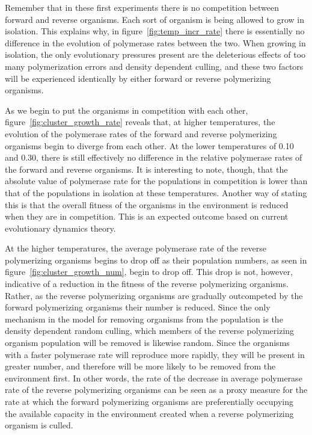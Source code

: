 Remember that in these first experiments there is no competition between forward and reverse organisms. Each sort of organism is being allowed to grow in isolation. This explains why, in figure~\ref{fig:temp_incr_rate} there is essentially no difference in the evolution of polymerase rates between the two. When growing in isolation, the only evolutionary pressures present are the deleterious effects of too many polymerization errors and density dependent culling, and these two factors will be experienced identically by either forward or reverse polymerizing organisms.

As we begin to put the organisms in competition with each other, figure~\ref{fig:cluster_growth_rate} reveals that, at higher temperatures, the evolution of the polymerase rates of the forward and reverse polymerizing organisms begin to diverge from each other. At the lower temperatures of 0.10 and 0.30, there is still effectively no difference in the relative polymerase rates of the forward and reverse organisms. It is interesting to note, though, that the absolute value of polymerase rate for the populations in competition is lower than that of the populations in isolation at these temperatures. Another way of stating this is that the overall fitness of the organisms in the environment is reduced when they are in competition. This is an expected outcome based on current evolutionary dynamics theory.

At the higher temperatures, the average polymerase rate of the reverse polymerizing organisms begins to drop off as their population numbers, as seen in figure~\ref{fig:cluster_growth_num}, begin to drop off. This drop is not, however, indicative of a reduction in the fitness of the reverse polymerizing organisms. Rather, as the reverse polymerizing organisms are gradually outcompeted by the forward polymerizing organisms their number is reduced. Since the only mechanism in the model for removing organisms from the population is the density dependent random culling, which members of the reverse polymerizing organism population will be removed is likewise random. Since the organisms with a faster polymerase rate will reproduce more rapidly, they will be present in greater number, and therefore will be more likely to be removed from the environment first. In other words, the rate of the decrease in average polymerase rate of the reverse polymerizing organisms can be seen as a proxy measure for the rate at which the forward polymerizing organisms are preferentially occupying the available capacity in the environment created when a reverse polymerizing organism is culled.

